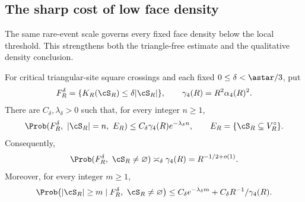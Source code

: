\subsection{The sharp cost of low face density}\label{sec:lowdensity}

The same rare-event scale governs every fixed face density below the local threshold. This strengthens both the triangle-free estimate and the qualitative density conclusion.

\begin{theorem}\label{thm:lowdensity}
For critical triangular-site square crossings and each fixed $0\le\delta<\astar/3$, put
\[
 F_R^\delta=\{K_R(\cS_R)\le\delta|\cS_R|\},\qquad
 \gamma_4(R)=R^2\alpha_4(R)^2.
\]
There are $C_\delta,\lambda_\delta>0$ such that, for every integer $n\ge1$,
\begin{equation}\label{eq:lowdensity_size}
 \Prob(F_R^\delta,\ |\cS_R|=n,\ E_R)
 \le C_\delta\gamma_4(R)e^{-\lambda_\delta n},
 \qquad E_R=\{\cS_R\subseteq V_R^\circ\}.
\end{equation}
Consequently,
\begin{equation}\label{eq:lowdensity_mass}
 \Prob(F_R^\delta,\ \cS_R\ne\varnothing)
 \asymp_\delta\gamma_4(R)=R^{-1/2+o(1)}.
\end{equation}
Moreover, for every integer $m\ge1$,
\[
 \Prob\bigl(|\cS_R|\ge m\mid F_R^\delta,\ \cS_R\ne\varnothing\bigr)
 \le C_\delta e^{-\lambda_\delta m}+C_\delta R^{-1}/\gamma_4(R).
\]
\end{theorem}
